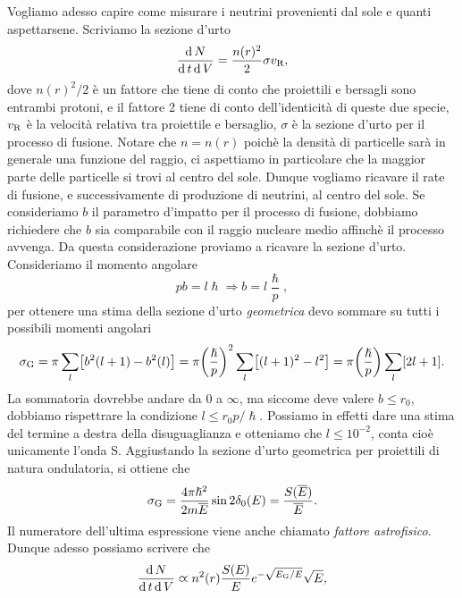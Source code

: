 Vogliamo adesso capire come misurare i neutrini provenienti dal sole e quanti aspettarsene. Scriviamo la sezione d'urto
\begin{equation*}
    \frac{\operatorname{d} N}{\operatorname{d} t \operatorname{d} V} = \frac{n(r)^2}{2} \sigma v_\textup{R},
\end{equation*}
dove $n(r)^2/2$ è un fattore che tiene di conto che proiettili e bersagli sono entrambi protoni, e il fattore 2 tiene di conto dell'identicità di queste due specie, $v_\textup{R}$ è la velocità relativa tra proiettile e bersaglio, $\sigma$ è la sezione d'urto per il processo di fusione. Notare che $n = n(r)$ poichè la densità di particelle sarà in generale una funzione del raggio, ci aspettiamo in particolare che la maggior parte delle particelle si trovi al centro del sole. Dunque vogliamo ricavare il rate di fusione, e successivamente di produzione di neutrini, al centro del sole. Se consideriamo $b$ il parametro d'impatto per il processo di fusione, dobbiamo richiedere che $b$ sia comparabile con il raggio nucleare medio affinchè il processo avvenga. Da questa considerazione proviamo a ricavare la sezione d'urto. Consideriamo il momento angolare
\begin{equation*}
    pb = l\hslash \Rightarrow b = l \frac{\hslash}{p},
\end{equation*}
per ottenere una stima della sezione d'urto \emph{geometrica} devo sommare su tutti i possibili momenti angolari
\begin{equation*}
    \sigma_\textup{G} = \pi \sum_l\bigl[ b^2(l+1) - b^2(l) \bigr] = \pi \biggl(\frac{\hslash}{p}\biggr)^2 \sum_l \bigl[ (l+1)^2 - l^2 \bigr] = \pi \biggl(\frac{\hslash}{p}\biggr)\sum_l[2l + 1].
\end{equation*}
La sommatoria dovrebbe andare da $0$ a $\infty$, ma siccome deve valere $b \leq r_0$, dobbiamo rispettrare la condizione $l \leq r_0 p /\hslash$. Possiamo in effetti dare una stima del termine a destra della disuguaglianza e otteniamo che $l \leq 10^{-2}$, conta cioè unicamente l'onda S. Aggiustando la sezione d'urto geometrica per proiettili di natura ondulatoria, si ottiene che 
\begin{equation*}
    \sigma_\textup{G} = \frac{4\pi \hslash^2}{2m \overline{E}} \sin2 \delta_0 (E) = \frac{S(\overline{E})}{\overline{E}}.
\end{equation*}
Il numeratore dell'ultima espressione viene anche chiamato \emph{fattore astrofisico}. Dunque adesso possiamo scrivere che
\begin{equation*}
    \frac{\operatorname{d} N}{\operatorname{d} t \operatorname{d} V} \varpropto n^2(r) \frac{S(E)}{E} e^{-\sqrt{E_\textup{G} / E}}\sqrt{E},
\end{equation*}
